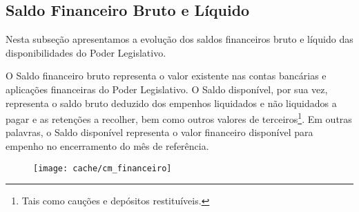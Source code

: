 
\subsection[Saldo Financeiro]{Saldo Financeiro Bruto e Líquido}

Nesta subseção apresentamos a evolução dos saldos financeiros bruto e líquido das disponibilidades do Poder Legislativo.



O Saldo financeiro bruto representa o valor existente nas contas bancárias e aplicações financeiras do Poder Legislativo. O Saldo disponível, por sua vez, representa o saldo bruto deduzido dos empenhos liquidados e não liquidados a pagar e as retenções a recolher, bem como outros valores de terceiros\footnote{Tais como cauções e depósitos restituíveis.}. Em outras palavras, o Saldo disponível representa o valor financeiro disponível para empenho no encerramento do mês de referência.

\begin{figure}[H]
\center
\texttt{[image: cache/cm\_financeiro]}
\end{figure}
